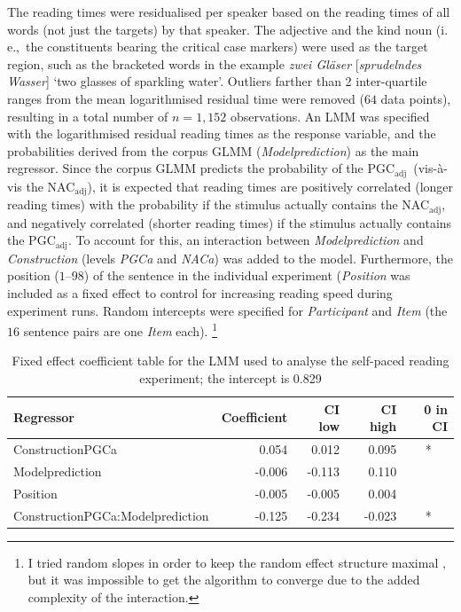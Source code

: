 \documentclass[USenglish]{article}
\newcommand{\ie}{i.\,e.,}
\newcommand{\Sub}[1]{\ensuremath{\mathrm{_{#1}}}}
\newcommand{\NACa}{NAC\Sub{adj}}
\newcommand{\PGCa}{PGC\Sub{adj}}
\begin{document}
The reading times were residualised per speaker based on the reading times of all words (not just the targets) by that speaker.
The adjective and the kind noun (\ie\ the constituents bearing the critical case markers) were used as the target region, such as the bracketed words in the example \textit{zwei Gläser} [\textit{sprudelndes Wasser}] `two glasses of sparkling water'.
Outliers farther than 2 inter-quartile ranges from the mean logarithmised residual time were removed ($64$ data points), resulting in a total number of $n=1,152$ observations.
An LMM was specified with the logarithmised residual reading times as the response variable, and the probabilities derived from the corpus GLMM (\textit{Modelprediction}) as the main regressor.
Since the corpus GLMM predicts the probability of the \PGCa\ (vis-à-vis the \NACa), it is expected that reading times are positively correlated (longer reading times) with the probability if the stimulus actually contains the \NACa, and negatively correlated (shorter reading times) if the stimulus actually contains the \PGCa.
To account for this, an interaction between \textit{Modelprediction} and \textit{Construction} (levels \textit{PGCa} and \textit{NACa}) was added to the model.
Furthermore, the position ($1$--$98$) of the sentence in the individual experiment (\textit{Position} was included as a fixed effect to control for increasing reading speed during experiment runs.
Random intercepts were specified for \textit{Participant} and \textit{Item} (the $16$ sentence pairs are one \textit{Item} each).%
\footnote{I tried random slopes in order to keep the random effect structure maximal \citep{BarrEa2013}, but it was impossible to get the algorithm to converge due to the added complexity of the interaction.}

\begin{table}
  \centering
  \begin{tabular}{lrrrc}
    Regressor & \multicolumn{1}{r}{Coefficient} & \multicolumn{1}{r}{CI low} & \multicolumn{1}{r}{CI high} & \multicolumn{1}{r}{0 in CI} \\ \midrule
    ConstructionPGCa                 &  0.054 &  0.012 &  0.095 &  *  \\ 
    Modelprediction                  & -0.006 & -0.113 &  0.110 &     \\ 
    Position                         & -0.005 & -0.005 &  0.004 &     \\ 
    ConstructionPGCa:Modelprediction & -0.125 & -0.234 & -0.023 &  *  \\ 
  \end{tabular}
  \caption{Fixed effect coefficient table for the LMM used to analyse the self-paced reading experiment; the intercept is 0.829}
  \label{tab:exp:spr}
\end{table}
\end{document}
